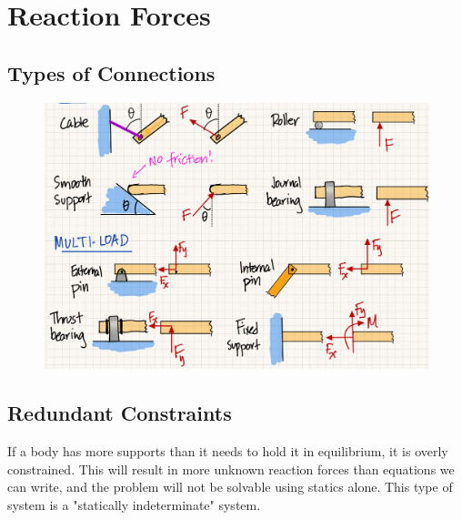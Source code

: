 \section{Reaction Forces}

\subsection{Types of Connections}

\begin{figure}[!h]
\centering
\includegraphics[angle=0, width=\textwidth]{ReactionForcesFigures/ReactionForces.jpg}
\vspace{-2mm}
\caption{\small {}}
\vspace{-3mm}
\label{Fig:NewtonsLaws}
\end{figure}




\subsection{Redundant Constraints}

If a body has more supports than it needs to hold it in equilibrium, it is overly constrained. This will result in more unknown reaction forces than equations we can write, and the problem will not be solvable using statics alone. This type of system is a "statically indeterminate" system. 

